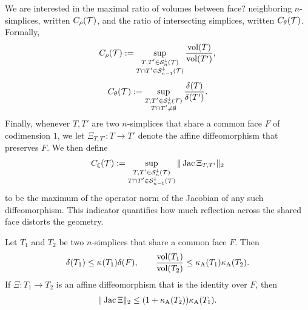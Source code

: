 \documentclass[10pt,letterpaper]{article}
\newcommand{\mwl}[1]{{\color{red}#1}}
\begin{document}
We are interested in the maximal ratio of volumes between \mwl{face?} neighboring $n$-simplices, written $C_\rho({\mathcal T})$,
and the ratio of intersecting simplices, written $C_\theta({\mathcal T})$. Formally, 
\begin{align}\label{math:volumeratio}
    C_\rho({\mathcal T}) 
    := 
    \sup_{ \substack{ T, T' \in {\mathcal S}^{\downarrow}_{n}({\mathcal T}) \\ T \cap T' \in {\mathcal S}^{\downarrow}_{n-1}({\mathcal T}) } } 
    \frac{ \operatorname{vol}(T) }{ \operatorname{vol}(T') }
    ,
\end{align}
\begin{align}\label{math:diameterratio}
    C_\theta({\mathcal T}) 
    := 
    \sup_{ \substack{ T, T' \in {\mathcal S}^{\downarrow}_{n}({\mathcal T}) \\ T \cap T' \neq \emptyset } }
    \frac{ {\delta}(T) }{ {\delta}(T') }
    .
\end{align}
Finally, whenever $T, T'$ are two $n$-simplices that share a common face $F$ of codimension $1$, we let $\Xi_{T,T'} : T \rightarrow T'$ denote the affine diffeomorphism 
that preserves $F$. We then define 
\begin{align}\label{math:reflectionmeasure}
    C_\xi({\mathcal T}) 
    := 
    \sup_{ \substack{ T, T' \in {\mathcal S}^{\downarrow}_{n}({\mathcal T}) \\ T \cap T' \in {\mathcal S}^{\downarrow}_{n-1}({\mathcal T}) } }
    \|  \operatorname{{\rm Jac}} \Xi_{T,T'}  \|_{2}
\end{align}
to be the maximum of the operator norm of the Jacobian of any such diffeomorphism. 
This indicator quantifies how much reflection across the shared face distorts the geometry. 



\begin{lemma}\label{lemma:volumecomparison}
    Let $T_1$ and $T_2$ be two $n$-simplices that share a common face $F$. Then 
    \begin{align*}
        {\delta}(T_1)
        \leq 
        \kappa_{}(T_1)
        {\delta}(F)
        ,
        \qquad 
        \frac{ \operatorname{vol}(T_1) }{ \operatorname{vol}(T_2) }
        \leq 
        \kappa_{\rm A}(T_1) \kappa_{\rm A}(T_2)
        .
    \end{align*}
    If $\Xi : T_1 \rightarrow T_2$ is an affine diffeomorphism that is the identity over $F$, then 
    \begin{align*}
        \|  \operatorname{{\rm Jac}} \Xi  \|_{2}
        \leq 
        ( 1 + \kappa_{\rm A}(T_2) ) \kappa_{\rm A}(T_1)
        .
    \end{align*}
\end{lemma}
\end{document}
